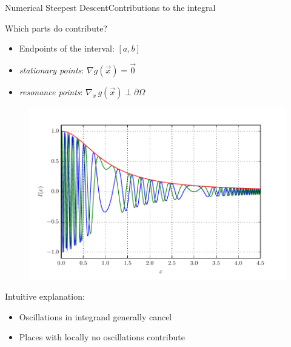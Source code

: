 \documentclass{beamer}
\begin{document}
\begin{frame}{Numerical Steepest Descent}{Contributions to the integral}
  \begin{minipage}{0.6\linewidth}
    Which parts do contribute?
    \begin{itemize}
      \item Endpoints of the interval: $[a, b]$
      \item \emph{stationary points}: $\nabla g(\vec{x}) = \vec{0}$
      \item \emph{resonance points}: $\nabla_x \, g(\vec{x}) \perp \partial \Omega$
    \end{itemize}
  \end{minipage}
  \begin{minipage}{0.38\linewidth}
    \begin{figure}
      \centering
      \includegraphics[width=\linewidth]{./fig/oscillatory_example_2.pdf}
    \end{figure}
  \end{minipage}
  Intuitive explanation:
  \begin{itemize}
    \item Oscillations in integrand generally cancel
    \item Places with locally no oscillations contribute
  \end{itemize}
\end{frame}
\end{document}
